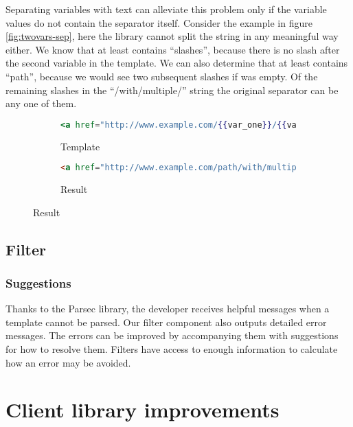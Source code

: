 \documentclass[thesis.tex]{subfiles}
\begin{document}
Separating variables with text can alleviate this problem only if the variable
values do not contain the separator itself. Consider the example in figure
\ref{fig:twovars-sep}, here the library cannot split the string in any
meaningful way either. We know that  at least contains
``slashes'', because there is no slash after the second variable in the
template. We can also determine that  at least contains
``path'', because we would see two subsequent slashes if  was
empty. Of the remaining slashes in the ``/with/multiple/'' string the
original separator can be any one of them.
\begin{figure}
	\centering
	\caption{Two variables separated with a `/'}
	\label{fig:twovars-sep}
	\begin{subfigure}{\textwidth}
		\begin{lstlisting}[language=mustache]
<a href="http://www.example.com/{{var_one}}/{{var_two}</a>
		\end{lstlisting}
		\caption{Template}
		\label{fig:twovars-sep.mustache}
	\end{subfigure}
	
	\begin{subfigure}{\textwidth}
		\begin{lstlisting}[language=HTML]
<a href="http://www.example.com/path/with/multiple/slashes</a>
		\end{lstlisting}
		\caption{Result}
		\label{fig:twovars-sep.html}
	\end{subfigure}
\end{figure}

\subsection{Filter}

\subsubsection{Suggestions}
Thanks to the Parsec library, the developer receives helpful messages when a
template cannot be parsed. Our filter component also outputs detailed error
messages. The errors can be improved by accompanying them with suggestions for
how to resolve them. Filters have access to enough information to calculate how
an error may be avoided.

\section{Client library improvements}
\end{document}
